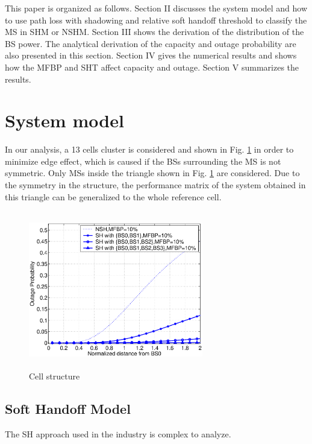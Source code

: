This paper is organized as follows. Section II discusses the
system model and how to use path loss with shadowing and relative
soft handoff threshold to classify the MS in SHM or NSHM. Section
III shows the derivation of the distribution of the BS power. The
analytical derivation of the capacity and outage probability are
also presented in this section. Section IV gives the numerical
results and shows how the MFBP and SHT affect capacity and outage.
Section V summarizes the results.

\section{System model}
In our analysis, a 13 cells cluster is considered and shown in
Fig. \ref{figrawcon:1} in order to minimize edge effect, which is
caused if the BSs surrounding the MS is not symmetric. Only MSs
inside the triangle shown in Fig. \ref{figrawcon:1} are
considered. Due to the symmetry in the structure, the performance
matrix of the system obtained in this triangle can be generalized
to the whole reference cell.
\begin{figure}[tbp]
 \centerline{\includegraphics[width=3in,height=2.7in]{./separateoutage10.eps}}
 \caption{Cell structure} \label{figrawcon:1}
\end{figure}

\subsection{Soft Handoff Model}
\label{shdefinition} The SH approach used in the industry is
complex to analyze.

